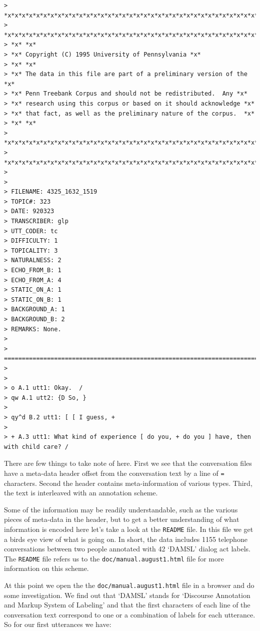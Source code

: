 \documentclass[
  letterpaper,
]{latex/krantz}
\begin{document}
\begin{verbatim}
>
*x*x*x*x*x*x*x*x*x*x*x*x*x*x*x*x*x*x*x*x*x*x*x*x*x*x*x*x*x*x*x*x*x*x*x*x*x*
>
*x*x*x*x*x*x*x*x*x*x*x*x*x*x*x*x*x*x*x*x*x*x*x*x*x*x*x*x*x*x*x*x*x*x*x*x*x*
> *x* *x*
> *x* Copyright (C) 1995 University of Pennsylvania *x*
> *x* *x*
> *x* The data in this file are part of a preliminary version of the
*x*
> *x* Penn Treebank Corpus and should not be redistributed.  Any *x*
> *x* research using this corpus or based on it should acknowledge *x*
> *x* that fact, as well as the preliminary nature of the corpus.  *x*
> *x* *x*
>
*x*x*x*x*x*x*x*x*x*x*x*x*x*x*x*x*x*x*x*x*x*x*x*x*x*x*x*x*x*x*x*x*x*x*x*x*x*
>
*x*x*x*x*x*x*x*x*x*x*x*x*x*x*x*x*x*x*x*x*x*x*x*x*x*x*x*x*x*x*x*x*x*x*x*x*x*
>
>
> FILENAME: 4325_1632_1519
> TOPIC#: 323
> DATE: 920323
> TRANSCRIBER: glp
> UTT_CODER: tc
> DIFFICULTY: 1
> TOPICALITY: 3
> NATURALNESS: 2
> ECHO_FROM_B: 1
> ECHO_FROM_A: 4
> STATIC_ON_A: 1
> STATIC_ON_B: 1
> BACKGROUND_A: 1
> BACKGROUND_B: 2
> REMARKS: None.
>
>
=========================================================================
>
>
> o A.1 utt1: Okay.  /
> qw A.1 utt2: {D So, }
>
> qy^d B.2 utt1: [ [ I guess, +
>
> + A.3 utt1: What kind of experience [ do you, + do you ] have, then
with child care? /
\end{verbatim}

There are few things to take note of here. First we see that the
conversation files have a meta-data header offset from the conversation
text by a line of \texttt{=} characters. Second the header contains
meta-information of various types. Third, the text is interleaved with
an annotation scheme.

Some of the information may be readily understandable, such as the
various pieces of meta-data in the header, but to get a better
understanding of what information is encoded here let's take a look at
the \texttt{README} file. In this file we get a birds eye view of what
is going on. In short, the data includes 1155 telephone conversations
between two people annotated with 42 `DAMSL' dialog act labels. The
\texttt{README} file refers us to the \texttt{doc/manual.august1.html}
file for more information on this scheme.

At this point we open the the \texttt{doc/manual.august1.html} file in a
browser and do some investigation. We find out that `DAMSL' stands for
`Discourse Annotation and Markup System of Labeling' and that the first
characters of each line of the conversation text correspond to one or a
combination of labels for each utterance. So for our first utterances we
have:
\end{document}
